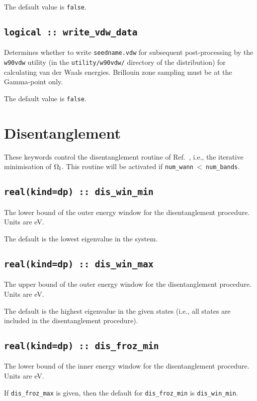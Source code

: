 The default value is \verb#false#.

\subsection[write\_vdw\_data]{\tt logical :: write\_vdw\_data}

Determines whether to write \verb#seedname.vdw# for
subsequent post-processing by the \verb#w90vdw# utility
(in the \verb#utility/w90vdw/# directory of the
distribution) for calculating van der Waals energies.
Brillouin zone sampling must be at the Gamma-point only.

The default value is \verb#false#.


\section{Disentanglement}
These keywords control the disentanglement routine of
Ref.~\cite{souza-prb01}, i.e., the iterative minimisation of $\Omega_{\mathrm{I}}$. This
routine will be activated if \verb#num_wann#$\:<\:$\verb#num_bands#.


\subsection[dis\_win\_min]{\tt real(kind=dp) :: dis\_win\_min}
The lower bound of the outer energy window for the disentanglement
procedure. Units are eV.

The default is the lowest eigenvalue in the system.

\subsection[dis\_win\_max]{\tt real(kind=dp) :: dis\_win\_max}
The upper bound of the outer energy window for the disentanglement
procedure. Units are eV.

The default is the highest eigenvalue in the given states (i.e., all states
are included in the disentanglement procedure).

\subsection[dis\_froz\_min]{\tt real(kind=dp) :: dis\_froz\_min}
The lower bound of the inner energy window for the disentanglement
procedure.  Units are eV.

If \verb#dis_froz_max# is given, then the default for
\verb#dis_froz_min# is \verb#dis_win_min#.


